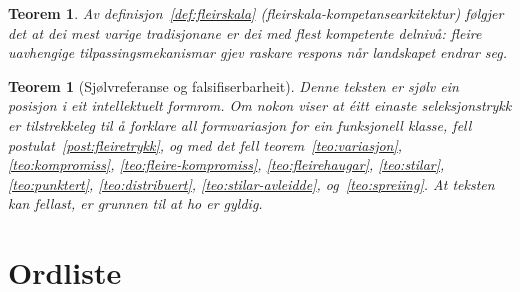 \documentclass[11pt, a4paper]{article}
\theoremstyle{definition}
\theoremstyle{plain}
\newtheorem{teorem}[defn]{Teorem}
\theoremstyle{remark}
\begin{document}
\begin{teorem}
\label{teo:varige}
Av definisjon~\ref{def:fleirskala} (fleirskala-kompetansearkitektur) f\o lgjer det at
dei mest varige tradisjonane er dei med flest kompetente delniv\aa: fleire uavhengige
tilpassingsmekanismar gjev raskare respons n\aa r landskapet endrar seg.
\end{teorem}

\begin{teorem}[Sj\o lvreferanse og falsifiserbarheit]
\label{teo:sjoelvreferanse}
Denne teksten er sj\o lv ein posisjon i eit intellektuelt formrom. Om nokon viser at
\'eitt einaste seleksjonstrykk er tilstrekkeleg til \aa{} forklare all formvariasjon for
ein funksjonell klasse, fell postulat~\ref{post:fleiretrykk}, og med det fell
teorem~\ref{teo:variasjon}, \ref{teo:kompromiss}, \ref{teo:fleire-kompromiss},
\ref{teo:fleirehaugar}, \ref{teo:stilar}, \ref{teo:punktert}, \ref{teo:distribuert},
\ref{teo:stilar-avleidde}, og~\ref{teo:spreiing}.
At teksten kan fellast, er grunnen til at ho er gyldig.
\end{teorem}


\section*{Ordliste}
\label{sec:ordliste}
\end{document}
